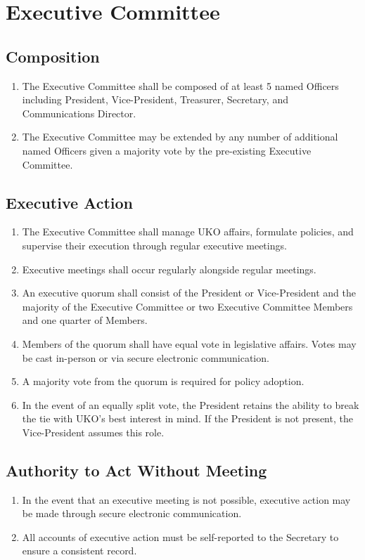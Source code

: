 \documentclass[12pt,executivepaper]{article}
\begin{document}
\section{Executive Committee}

\subsection{Composition}
\begin{enumerate}
    \item The Executive Committee shall be composed of at least 5 named Officers including
          President, Vice-President, Treasurer, Secretary, and Communications Director. 
    \item The Executive Committee may be extended by any number of additional named Officers
          given a majority vote by the pre-existing Executive Committee.
\end{enumerate}

\subsection{Executive Action}
\begin{enumerate}
    \item The Executive Committee shall manage UKO affairs, formulate policies, and supervise
          their execution through regular executive meetings.
    \item Executive meetings shall occur regularly alongside regular meetings.
    \item An executive quorum shall consist of the President or Vice-President
          and the majority of the Executive Committee or two Executive
          Committee Members and one quarter of Members.
    \item Members of the quorum shall have equal vote in legislative affairs.
          Votes may be cast in-person or via secure electronic communication.
    \item A majority vote from the quorum is required for policy adoption.
    \item In the event of an equally split vote, the President retains the ability to
          break the tie with UKO's best interest in mind. If the President is not present,
          the Vice-President assumes this role.
\end{enumerate}

\subsection{Authority to Act Without Meeting}
\begin{enumerate}
    \item In the event that an executive meeting is not possible, executive action
          may be made through secure electronic communication.
    \item All accounts of executive action must be self-reported to the
          Secretary to ensure a consistent record.
\end{enumerate}
\end{document}
